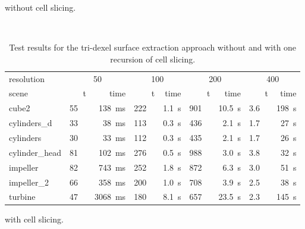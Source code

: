 \begin{table}
\begin{subtable}{\textwidth}
		\caption{
			without cell slicing.
		}
		\label{tbl:tri_dexel_results_no_slicing}
	\end{subtable}
	\bigskip\\
	\begin{subtable}{\textwidth}
		\centering
		\begin{tabular}{l|rr|rr|rr|rr}
			resolution     & \multicolumn{2}{c}{50} & \multicolumn{2}{c}{100} & \multicolumn{2}{c}{200} & \multicolumn{2}{c}{400} \\
			scene          & t\sub{out} & time & t\sub{out} & time & t\sub{out} & time & t\sub{out} & time \\
			\midrule
			cube2          & \SI{55}{\kilo\nothing} & \SI{ 138}{\milli\second} & \SI{222}{\kilo\nothing} & \SI{1.1}{\second} & \SI{901}{\kilo\nothing} & \SI{10.5}{\second} & \SI{3.6}{\mega\nothing} & \SI{198}{\second} \\
			cylinders\_d   & \SI{33}{\kilo\nothing} & \SI{  38}{\milli\second} & \SI{113}{\kilo\nothing} & \SI{0.3}{\second} & \SI{436}{\kilo\nothing} & \SI{ 2.1}{\second} & \SI{1.7}{\mega\nothing} & \SI{ 27}{\second} \\
			cylinders      & \SI{30}{\kilo\nothing} & \SI{  33}{\milli\second} & \SI{112}{\kilo\nothing} & \SI{0.3}{\second} & \SI{435}{\kilo\nothing} & \SI{ 2.1}{\second} & \SI{1.7}{\mega\nothing} & \SI{ 26}{\second} \\
			cylinder\_head & \SI{81}{\kilo\nothing} & \SI{ 102}{\milli\second} & \SI{276}{\kilo\nothing} & \SI{0.5}{\second} & \SI{988}{\kilo\nothing} & \SI{ 3.0}{\second} & \SI{3.8}{\mega\nothing} & \SI{ 32}{\second} \\
			impeller       & \SI{82}{\kilo\nothing} & \SI{ 743}{\milli\second} & \SI{252}{\kilo\nothing} & \SI{1.8}{\second} & \SI{872}{\kilo\nothing} & \SI{ 6.3}{\second} & \SI{3.0}{\mega\nothing} & \SI{ 51}{\second} \\
			impeller\_2    & \SI{66}{\kilo\nothing} & \SI{ 358}{\milli\second} & \SI{200}{\kilo\nothing} & \SI{1.0}{\second} & \SI{708}{\kilo\nothing} & \SI{ 3.9}{\second} & \SI{2.5}{\mega\nothing} & \SI{ 38}{\second} \\
			turbine        & \SI{47}{\kilo\nothing} & \SI{3068}{\milli\second} & \SI{180}{\kilo\nothing} & \SI{8.1}{\second} & \SI{657}{\kilo\nothing} & \SI{23.5}{\second} & \SI{2.3}{\mega\nothing} & \SI{145}{\second} \\
		\end{tabular}
		\caption{
			with cell slicing.
		}
		\label{tbl:tri_dexel_results_slicing}
	\end{subtable}
	\caption{
		Test results for the tri-dexel surface extraction approach without and with one recursion of cell slicing.
	}
	\label{tbl:tri_dexel_results}
\end{table}
